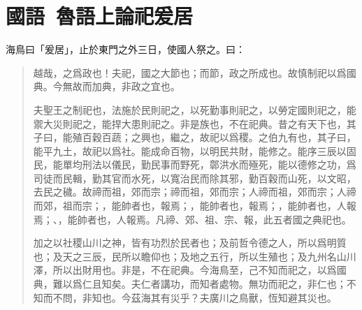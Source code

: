 \section[展禽論祀爰居\quad{\small 國語 魯語上}]{{\normalsize 國語\ 魯語上}\quad {}論祀爰居}
海鳥曰「爰居」，止於東門之外三日，使國人祭之。曰：

\begin{quotation}
越哉，之爲政也！夫祀，國之大節也；而節，政之所成也。故慎制祀以爲國典。今無故而加典，非政之宜也。

夫聖王之制祀也，法施於民則祀之，以死勤事則祀之，以勞定國則祀之，能禦大災則祀之，能捍大患則祀之。非是族也，不在祀典。昔之有天下也，其子曰，能殖百穀百蔬；之興也，繼之，故祀以爲稷。之伯九有也，其子曰，能平九土，故祀以爲社。能成命百物，以明民共財，能修之。能序三辰以固民，能單均刑法以儀民，勤民事而野死，鄣洪水而殛死，能以德修之功，爲司徒而民輯，勤其官而水死，以寬治民而除其邪，勤百穀而山死，以文昭，去民之穢。故禘而祖，郊而宗；禘而祖，郊而宗；人禘而祖，郊而宗；人禘而郊，祖而宗；，能帥者也，報焉；，能帥者也，報焉；，能帥者也，人報焉；、，能帥者也，人報焉。凡禘、郊、祖、宗、報，此五者國之典祀也。

加之以社稷山川之神，皆有功烈於民者也；及前哲令德之人，所以爲明質也；及天之三辰，民所以瞻仰也；及地之五行，所以生殖也；及九州名山川澤，所以出財用也。非是，不在祀典。今海鳥至，己不知而祀之，以爲國典，難以爲仁且知矣。夫仁者講功，而知者處物。無功而祀之，非仁也；不知而不問，非知也。今茲海其有災乎？夫廣川之鳥獸，恆知避其災也。
\end{quotation}

